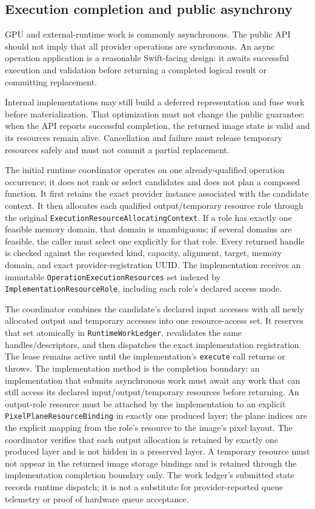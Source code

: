 \documentclass[11pt,a4paper,oneside]{article}
\begin{document}
\subsection{Execution completion and public asynchrony}

GPU and external-runtime work is commonly asynchronous. The public API should not imply that all provider operations are synchronous. An async operation application is a reasonable Swift-facing design: it awaits successful execution and validation before returning a completed logical result or committing replacement.

Internal implementations may still build a deferred representation and fuse work before materialization. That optimization must not change the public guarantee: when the API reports successful completion, the returned image state is valid and its resources remain alive. Cancellation and failure must release temporary resources safely and must not commit a partial replacement.

The initial runtime coordinator operates on one already-qualified operation occurrence; it does not rank or select candidates and does not plan a composed function. It first retains the exact provider instance associated with the candidate context. It then allocates each qualified output/temporary resource role through the original \texttt{ExecutionResourceAllocatingContext}. If a role has exactly one feasible memory domain, that domain is unambiguous; if several domains are feasible, the caller must select one explicitly for that role. Every returned handle is checked against the requested kind, capacity, alignment, target, memory domain, and exact provider-registration UUID. The implementation receives an immutable \texttt{OperationExecutionResources} set indexed by \texttt{ImplementationResourceRole}, including each role's declared access mode.

The coordinator combines the candidate's declared input accesses with all newly allocated output and temporary accesses into one resource-access set. It reserves that set atomically in \texttt{RuntimeWorkLedger}, revalidates the same handles/descriptors, and then dispatches the exact implementation registration. The lease remains active until the implementation's \texttt{execute} call returns or throws. The implementation method is the completion boundary: an implementation that submits asynchronous work must await any work that can still access its declared input/output/temporary resources before returning. An output-role resource must be attached by the implementation to an explicit \texttt{PixelPlaneResourceBinding} in exactly one produced layer; the plane indices are the explicit mapping from the role's resource to the image's pixel layout. The coordinator verifies that each output allocation is retained by exactly one produced layer and is not hidden in a preserved layer. A temporary resource must not appear in the returned image storage bindings and is retained through the implementation completion boundary only. The work ledger's submitted state records runtime dispatch; it is not a substitute for provider-reported queue telemetry or proof of hardware queue acceptance.
\end{document}
